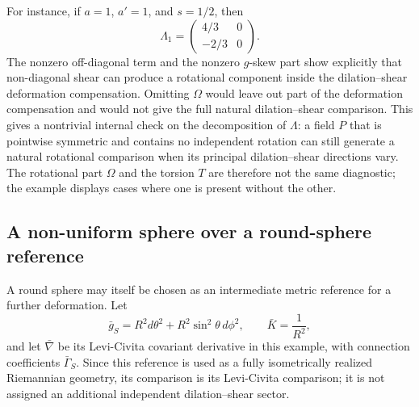 \documentclass[12pt]{amsart}
\theoremstyle{definition}
\theoremstyle{remark}
\begin{document}
For instance, if $a=1$, $a'=1$, and $s=1/2$, then
\begin{equation}
 \Lambda_1=\begin{pmatrix}4/3&0\\-2/3&0\end{pmatrix} .
\end{equation}
The nonzero off-diagonal term and the nonzero $g$-skew part show explicitly that non-diagonal shear can produce a rotational component inside the dilation--shear deformation compensation.  Omitting $\Omega$ would leave out part of the deformation compensation and would not give the full natural dilation--shear comparison.  This gives a nontrivial internal check on the decomposition of \(\Lambda\): a field \(P\) that is pointwise symmetric and contains no independent rotation can still generate a natural rotational comparison when its principal dilation--shear directions vary.  The rotational part \(\Omega\) and the torsion \(T\) are therefore not the same diagnostic; the example displays cases where one is present without the other.


\subsection{A non-uniform sphere over a round-sphere reference}\label{subsec:nonuniform_sphere_reference_v2}

A round sphere may itself be chosen as an intermediate metric reference for a further deformation.  Let
\begin{equation}\label{eq:round_sphere_reference_v2}
 \bar g_S=R^2d\theta^2+R^2\sin^2\theta\,d\phi^2,
 \qquad
 \bar K=\frac1{R^2},
\end{equation}
and let \(\bar\nabla\) be its Levi-Civita covariant derivative in this example, with connection coefficients \(\bar\Gamma_S\).  Since this reference is used as a fully isometrically realized Riemannian geometry, its comparison is its Levi-Civita comparison; it is not assigned an additional independent dilation--shear sector.
\end{document}
